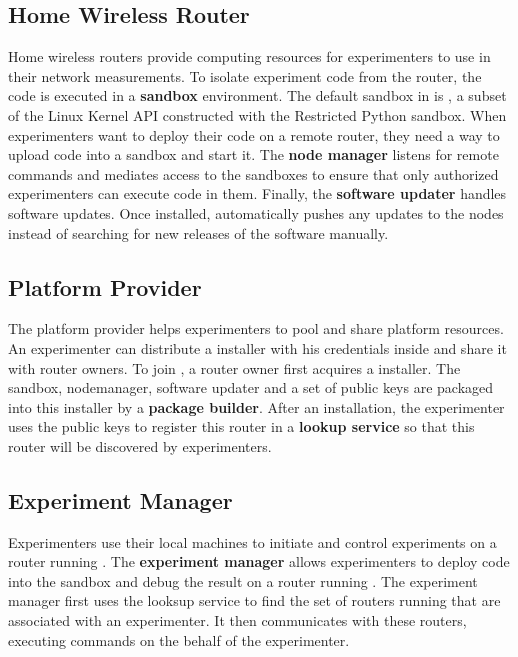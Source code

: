 \subsection{Home Wireless Router}
Home wireless routers provide computing resources for experimenters to use in their network measurements. To isolate experiment code from the router, the code is executed in a \textbf{sandbox} environment. The default sandbox in \sysname is \sandboxname, a subset of the Linux Kernel API constructed with the Restricted Python sandbox. When experimenters want to deploy their code on a remote router, they need a way to upload code into a sandbox and start it. The \textbf{node manager} listens for remote commands and mediates access to the sandboxes to ensure that only authorized experimenters can execute code in them. Finally, the \textbf{software updater} handles software updates. Once installed, automatically pushes any updates to the nodes instead of searching for new releases of the software manually.  

\subsection{Platform Provider}
The platform provider helps experimenters to pool and share platform resources. An experimenter can distribute a \sysname installer with his credentials inside and share it with router owners. To join \sysname, a router owner first acquires a \sysname installer. The sandbox, nodemanager, software updater and a set of public keys are packaged into this installer by a \textbf{package builder}. After an installation, the experimenter uses the public keys to register this router in a \textbf{lookup service} so that this router will be discovered by experimenters.

\subsection{Experiment Manager}
Experimenters use their local machines to initiate and control experiments on a router running \sysname. The \textbf{experiment manager} allows experimenters to deploy code into the sandbox and debug the result on a router running \sysname. The experiment manager first uses the looksup service to find the set of routers running \sysname that are associated with an experimenter. It then communicates with these routers, executing commands on the behalf of the experimenter.  

